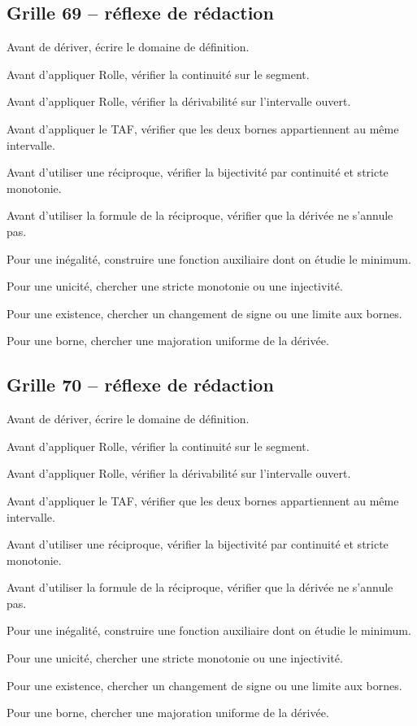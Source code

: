 \documentclass[11pt,a4paper]{article}
\begin{document}
\subsection*{Grille 69 -- réflexe de rédaction}

\begin{methodebox}

Avant de dériver, écrire le domaine de définition.

Avant d'appliquer Rolle, vérifier la continuité sur le segment.

Avant d'appliquer Rolle, vérifier la dérivabilité sur l'intervalle ouvert.

Avant d'appliquer le TAF, vérifier que les deux bornes appartiennent au même intervalle.

Avant d'utiliser une réciproque, vérifier la bijectivité par continuité et stricte monotonie.

Avant d'utiliser la formule de la réciproque, vérifier que la dérivée ne s'annule pas.

Pour une inégalité, construire une fonction auxiliaire dont on étudie le minimum.

Pour une unicité, chercher une stricte monotonie ou une injectivité.

Pour une existence, chercher un changement de signe ou une limite aux bornes.

Pour une borne, chercher une majoration uniforme de la dérivée.

\end{methodebox}

\subsection*{Grille 70 -- réflexe de rédaction}

\begin{methodebox}

Avant de dériver, écrire le domaine de définition.

Avant d'appliquer Rolle, vérifier la continuité sur le segment.

Avant d'appliquer Rolle, vérifier la dérivabilité sur l'intervalle ouvert.

Avant d'appliquer le TAF, vérifier que les deux bornes appartiennent au même intervalle.

Avant d'utiliser une réciproque, vérifier la bijectivité par continuité et stricte monotonie.

Avant d'utiliser la formule de la réciproque, vérifier que la dérivée ne s'annule pas.

Pour une inégalité, construire une fonction auxiliaire dont on étudie le minimum.

Pour une unicité, chercher une stricte monotonie ou une injectivité.

Pour une existence, chercher un changement de signe ou une limite aux bornes.

Pour une borne, chercher une majoration uniforme de la dérivée.

\end{methodebox}
\end{document}
